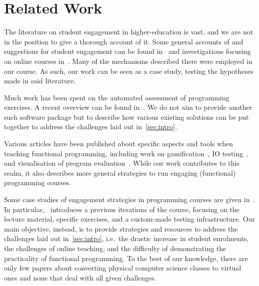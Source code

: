 \section{Related Work}\label{sec:related_work}


The literature on student engagement in higher-education is vast,
and we are not in the position to give a thorough account of it.
Some general accounts of and suggestions for
student engagement can be found in~\cite{student_engagement,engagementproposals}
and investigations focusing on online courses
in~\cite{onlineengagement3,onlineengagement2,onlineengagement4,onlineengagement5,onlineengagement1}.
Many of the mechanisms described there were employed in our course.
As such, our work can be seen as a case study, testing the hypotheses made in said literature.

Much work has been spent on the
automated assessment of programming exercises.
A recent overview can be found in~\cite{automatedassessment}.
We do not aim to provide another such software package but
to describe how various existing solutions
can be put together to
address the challenges laid out in~\cref{sec:intro}.

Various articles have been published about
specific aspects and tools when teaching functional programming,
including work on gamification~\cite{soccerfun},
IO testing~\cite{iotest2}, and
visualisation of program evaluation~\cite{steppingocaml}.
While our work contributes to this realm,
it also describes more general strategies
to run engaging (functional) programming courses.

Some case studies of engagement strategies in programming courses are given in~\cite{next_1100,engagingprogramming,largeprogrammingclass}.
In particular,~\cite{next_1100}
introduces a previous iterations of the course,
focusing on the lecture material,
specific exercises, and a custom-made testing infrastructure.
Our main objective, instead, is to provide strategies and resources to address
the challenges laid out in~\cref{sec:intro},
i.e.\ the drastic increase in student enrolments,
the challenges of online teaching,
and the difficulty of demonstrating the practicality of functional programming.
To the best of our knowledge,
there are only few papers about converting physical computer science classes to virtual ones
and none that deal with all given challenges.

